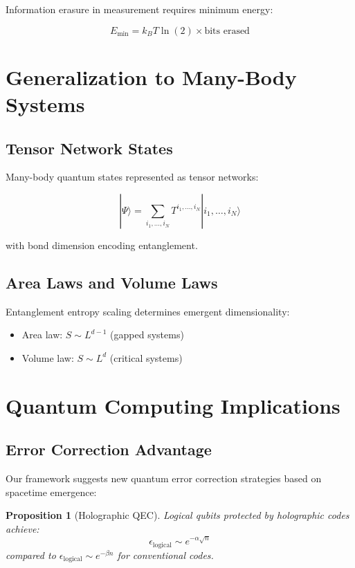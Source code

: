 \documentclass[12pt,a4paper]{article}
\newtheorem{proposition}[theorem]{Proposition}
\begin{document}
Information erasure in measurement requires minimum energy:

\begin{equation}
E_{\text{min}} = k_B T \ln(2) \times \text{bits erased}
\end{equation}

\section{Generalization to Many-Body Systems}

\subsection{Tensor Network States}

Many-body quantum states represented as tensor networks:

\begin{equation}
|\Psi\rangle = \sum_{i_1,\ldots,i_N} T^{i_1,\ldots,i_N} |i_1,\ldots,i_N\rangle
\end{equation}

with bond dimension encoding entanglement.

\subsection{Area Laws and Volume Laws}

Entanglement entropy scaling determines emergent dimensionality:

\begin{itemize}
\item Area law: $S \sim L^{d-1}$ (gapped systems)
\item Volume law: $S \sim L^d$ (critical systems)  
\end{itemize}

\section{Quantum Computing Implications}

\subsection{Error Correction Advantage}

Our framework suggests new quantum error correction strategies based on spacetime emergence:

\begin{proposition}[Holographic QEC]
Logical qubits protected by holographic codes achieve:
\begin{equation}
\epsilon_{\text{logical}} \sim e^{-\alpha \sqrt{n}}
\end{equation}
compared to $\epsilon_{\text{logical}} \sim e^{-\beta n}$ for conventional codes.
\end{proposition}
\end{document}
